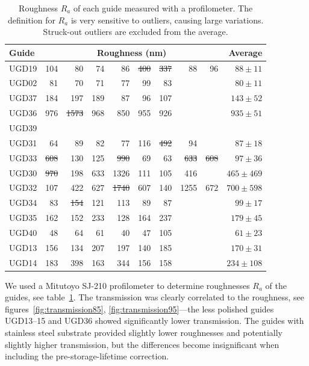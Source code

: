\documentclass[10pt,letterpaper]{article}
\begin{document}
\begin{table}
\centering
\caption{Roughness $R_a$ of each guide measured with a profilometer. The definition for $R_a$ is very sensitive to outliers, causing large variations. Struck-out outliers are excluded from the average.}
\begin{tabular}{l r r r r r r r r r}
\toprule
Guide & \multicolumn{8}{c}{Roughness (\si{\nano\meter})} & Average \\
\midrule
UGD19 & 104 & 80 & 74 & 86 & \sout{400} & \sout{337} & 88 & 96 & $88 \pm 11$ \\
UGD02 & 81 & 70 & 71 & 77 & 99 & 83 & & & $80 \pm 11$ \\
UGD37 & 184 & 197 & 189 & 87 & 96 & 107 & & & $143 \pm 52$ \\
UGD36 & 976 & \sout{1573} & 968 & 850 & 955 & 926 & & & $935 \pm 51$ \\
UGD39 & & & & & & & & & \\
UGD31 & 64 & 89 & 82 & 77 & 116 & \sout{492} & 94 & & $87 \pm 18$ \\
UGD33 & \sout{608} & 130 & 125 & \sout{990} & 69 & 63 & \sout{633} & \sout{608} & $97 \pm 36$ \\
UGD30 & \sout{970} & 198 & 633 & 1326 & 111 & 105 & 416 & & $465 \pm 469$ \\
UGD32 & 107 & 422 & 627 & \sout{1740} & 607 & 140 & 1255 & 672 & $700 \pm 598$ \\
UGD34 & 83 & \sout{154} & 121 & 113 & 89 & 87 & & & $99 \pm 17$ \\
UGD35 & 162 & 152 & 233 & 128 & 164 & 237 & & & $179 \pm 45$ \\
UGD40 & 48 & 64 & 61 & 40 & 47 & 105 & & & $61 \pm 23$ \\
UGD13 & 156 & 134 & 207 & 197 & 140 & 185 & & & $170 \pm 31$ \\
UGD14 & 183 & 398 & 163 & 344 & 156 & 158 & & & $234 \pm 108$ \\
\bottomrule 
\end{tabular}
\label{tab:roughness}
\end{table}

We used a Mitutoyo SJ-210 profilometer to determine roughnesses $R_a$ of the guides, see table~\ref{tab:roughness}. The transmission was clearly correlated to the roughness, see figures~\ref{fig:transmission85}, \ref{fig:transmission95}---the less polished guides UGD13--15 and UGD36 showed significantly lower transmission. The guides with stainless steel substrate provided slightly lower roughnesses and potentially slightly higher transmission, but the differences become insignificant when including the pre-storage-lifetime correction.
\end{document}
